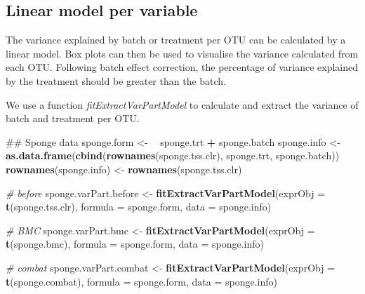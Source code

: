 \documentclass[]{book}
\newenvironment{Shaded}{\begin{snugshade}}{\end{snugshade}}
\newcommand{\KeywordTok}[1]{\textcolor[rgb]{0.13,0.29,0.53}{\textbf{#1}}}
\newcommand{\DataTypeTok}[1]{\textcolor[rgb]{0.13,0.29,0.53}{#1}}
\newcommand{\StringTok}[1]{\textcolor[rgb]{0.31,0.60,0.02}{#1}}
\newcommand{\CommentTok}[1]{\textcolor[rgb]{0.56,0.35,0.01}{\textit{#1}}}
\newcommand{\OperatorTok}[1]{\textcolor[rgb]{0.81,0.36,0.00}{\textbf{#1}}}
\newcommand{\ErrorTok}[1]{\textcolor[rgb]{0.64,0.00,0.00}{\textbf{#1}}}
\newcommand{\NormalTok}[1]{#1}
\begin{document}
\subsection{Linear model per variable}\label{linear-model-per-variable}

The variance explained by batch or treatment per OTU can be calculated
by a linear model. Box plots can then be used to visualise the variance
calculated from each OTU. Following batch effect correction, the
percentage of variance explained by the treatment should be greater than
the batch.

We use a function \emph{fitExtractVarPartModel} to calculate and extract
the variance of batch and treatment per OTU.

\begin{Shaded}
\begin{Highlighting}[]
\NormalTok{## Sponge data}
\NormalTok{sponge.form <-}\StringTok{ }\ErrorTok{~}\StringTok{ }\NormalTok{sponge.trt }\OperatorTok{+}\StringTok{ }\NormalTok{sponge.batch}
\NormalTok{sponge.info <-}\StringTok{ }\KeywordTok{as.data.frame}\NormalTok{(}\KeywordTok{cbind}\NormalTok{(}\KeywordTok{rownames}\NormalTok{(sponge.tss.clr), sponge.trt, sponge.batch))}
\KeywordTok{rownames}\NormalTok{(sponge.info) <-}\StringTok{ }\KeywordTok{rownames}\NormalTok{(sponge.tss.clr)}

\CommentTok{# before}
\NormalTok{sponge.varPart.before <-}\StringTok{ }\KeywordTok{fitExtractVarPartModel}\NormalTok{(}\DataTypeTok{exprObj =} \KeywordTok{t}\NormalTok{(sponge.tss.clr), }
                                                \DataTypeTok{formula =}\NormalTok{ sponge.form, }
                                                \DataTypeTok{data =}\NormalTok{ sponge.info)}

\CommentTok{# BMC}
\NormalTok{sponge.varPart.bmc <-}\StringTok{ }\KeywordTok{fitExtractVarPartModel}\NormalTok{(}\DataTypeTok{exprObj =} \KeywordTok{t}\NormalTok{(sponge.bmc), }
                                             \DataTypeTok{formula =}\NormalTok{ sponge.form, }
                                             \DataTypeTok{data =}\NormalTok{ sponge.info)}

\CommentTok{# combat}
\NormalTok{sponge.varPart.combat <-}\StringTok{ }\KeywordTok{fitExtractVarPartModel}\NormalTok{(}\DataTypeTok{exprObj =} \KeywordTok{t}\NormalTok{(sponge.combat), }
                                                \DataTypeTok{formula =}\NormalTok{ sponge.form, }
                                                \DataTypeTok{data =}\NormalTok{ sponge.info)}


\end{Highlighting}
\end{Shaded}
\end{document}
